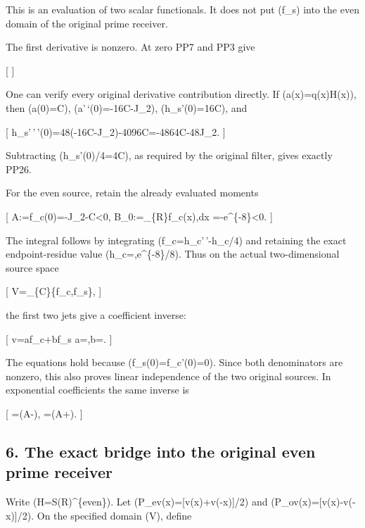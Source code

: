 \documentclass[
]{article}
\begin{document}
This is an evaluation of two scalar functionals. It does not put (f\_s)
into the even domain of the original prime receiver.

The first derivative is nonzero. At zero PP7 and PP3 give

{[}   {]}

One can verify every original derivative contribution directly. If
(a(x)=q(x)H(x)), then (a(0)=C), (a'\,`(0)=-16C-J\_2), (h\_s'(0)=16C),
and

{[} h\_s'\,'\,'(0)=48(-16C-J\_2)-4096C=-4864C-48J\_2. {]}

Subtracting (h\_s'(0)/4=4C), as required by the original filter, gives
exactly PP26.

For the even source, retain the already evaluated moments

{[} A:=f\_c(0)=-J\_2-C\textless0, \qquad
B\_0:=\int\_\{\mathbb R\}f\_c(x),dx
=-e\^{}\{-8\}\textless0.  {]}

The integral follows by integrating (f\_c=h\_c'\,'-h\_c/4) and retaining
the exact endpoint-residue value
(\int h\_c=,e\^{}\{-8\}/8). Thus on the actual
two-dimensional source space

{[} V=\_\{\mathbb C\}\{f\_c,f\_s\}, {]}

the first two jets give a coefficient inverse:

{[} v=af\_c+bf\_s \quad\Longrightarrow\quad
a=,\qquad b=.  {]}

The equations hold because (f\_s(0)=f\_c'(0)=0). Since both denominators
are nonzero, this also proves linear independence of the two original
sources. In exponential coefficients the same inverse is

{[} \alpha=\left(A-\right), \qquad
\beta=\left(A+\right). 
{]}

\subsection{6. The exact bridge into the original even prime
receiver}\label{the-exact-bridge-into-the-original-even-prime-receiver}

Write (\mathcal H=\mathcal S(\mathbb R)\^{}\{\rm even\}). Let
(P\_ev(x)={[}v(x)+v(-x){]}/2) and (P\_ov(x)={[}v(x)-v(-x){]}/2). On the
specified domain (V), define
\end{document}
